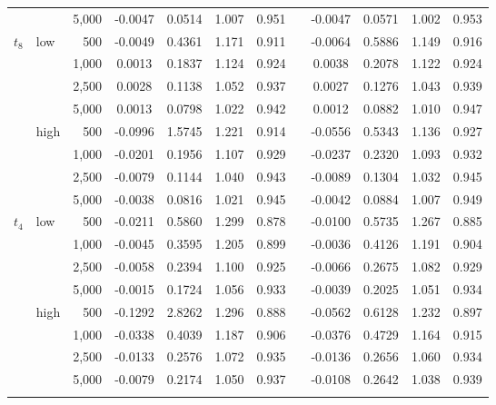 \begin{table}[t]
\begin{adjustbox}{width=1\textwidth}
\begin{tabular}{llr*{9}{c}}
 &  & 5,000 & -0.0047 & 0.0514 & 1.007 & 0.951 && -0.0047 & 0.0571 & 1.002 & 0.953\\
\addlinespace[3pt]
$t_8$ & low & 500 & -0.0049 & 0.4361 & 1.171 & 0.911 && -0.0064 & 0.5886 & 1.149 & 0.916\\
 &  & 1,000 & 0.0013 & 0.1837 & 1.124 & 0.924 && 0.0038 & 0.2078 & 1.122 & 0.924\\
 &  & 2,500 & 0.0028 & 0.1138 & 1.052 & 0.937 && 0.0027 & 0.1276 & 1.043 & 0.939\\
 &  & 5,000 & 0.0013 & 0.0798 & 1.022 & 0.942 && 0.0012 & 0.0882 & 1.010 & 0.947\\
\addlinespace[1pt]
 & high & 500 & -0.0996 & 1.5745 & 1.221 & 0.914 && -0.0556 & 0.5343 & 1.136 & 0.927\\
 &  & 1,000 & -0.0201 & 0.1956 & 1.107 & 0.929 && -0.0237 & 0.2320 & 1.093 & 0.932\\
 &  & 2,500 & -0.0079 & 0.1144 & 1.040 & 0.943 && -0.0089 & 0.1304 & 1.032 & 0.945\\
 &  & 5,000 & -0.0038 & 0.0816 & 1.021 & 0.945 && -0.0042 & 0.0884 & 1.007 & 0.949\\
\addlinespace[3pt]
$t_4$ & low & 500 & -0.0211 & 0.5860 & 1.299 & 0.878 && -0.0100 & 0.5735 & 1.267 & 0.885\\
 &  & 1,000 & -0.0045 & 0.3595 & 1.205 & 0.899 && -0.0036 & 0.4126 & 1.191 & 0.904\\
 &  & 2,500 & -0.0058 & 0.2394 & 1.100 & 0.925 && -0.0066 & 0.2675 & 1.082 & 0.929\\
 &  & 5,000 & -0.0015 & 0.1724 & 1.056 & 0.933 && -0.0039 & 0.2025 & 1.051 & 0.934\\
\addlinespace[1pt]
 & high & 500 & -0.1292 & 2.8262 & 1.296 & 0.888 && -0.0562 & 0.6128 & 1.232 & 0.897\\
 &  & 1,000 & -0.0338 & 0.4039 & 1.187 & 0.906 && -0.0376 & 0.4729 & 1.164 & 0.915\\
 &  & 2,500 & -0.0133 & 0.2576 & 1.072 & 0.935 && -0.0136 & 0.2656 & 1.060 & 0.934\\
 &  & 5,000 & -0.0079 & 0.2174 & 1.050 & 0.937 && -0.0108 & 0.2642 & 1.038 & 0.939\\
\bottomrule
&\\
\end{tabular}
\end{adjustbox}\end{table}
